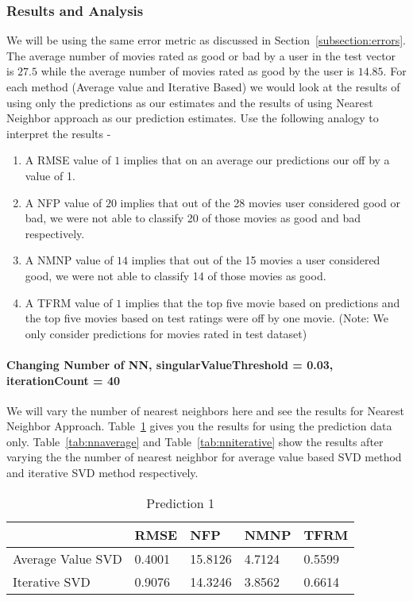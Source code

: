 \subsubsection{Results and Analysis}
We will be using the same error metric as discussed in Section~\ref{subsection:errors}. The average number of movies rated as good or bad by a user in the test vector is $27.5$ while the average number of movies rated as good by the user is $14.85$. For each method (Average value and Iterative Based) we would look at the results of using only the predictions as our estimates and the results of using Nearest Neighbor approach as our prediction estimates. Use the following analogy to interpret the results -
\begin{enumerate}
\item A RMSE value of $1$ implies that on an average our predictions our off by a value of 1.
\item A NFP value of $20$ implies that out of the 28 movies user considered good or bad, we were not able to classify 20 of those movies as good and bad respectively.
\item A NMNP value of $14$ implies that out of the 15 movies a user considered good, we were not able to classify 14 of those movies as good.
\item A TFRM value of $1$ implies that the top five movie based on predictions and the top five movies based on test ratings were off by one movie. (Note: We only consider predictions for movies rated in test dataset)
\end{enumerate}

\paragraph{Changing Number of NN, singularValueThreshold = 0.03, iterationCount = 40}
We will vary the number of nearest neighbors here and see the results for Nearest Neighbor Approach. Table~\ref{tab:prediction} gives you the results for using the prediction data only. Table~\ref{tab:nnaverage} and Table~\ref{tab:nniterative} show the results after varying the the number of nearest neighbor for average value based SVD method and iterative SVD method respectively.
\begin{table}[]
\centering
\caption{Prediction 1}
\label{tab:prediction}
\begin{tabular}{|l|l|l|l|l|}
\hline
                  & RMSE   & NFP     & NMNP   & TFRM   \\ \hline
Average Value SVD & 0.4001 & 15.8126 & 4.7124 & 0.5599 \\ \hline
Iterative SVD     & 0.9076 & 14.3246 & 3.8562 & 0.6614 \\ \hline
\end{tabular}
\end{table}

